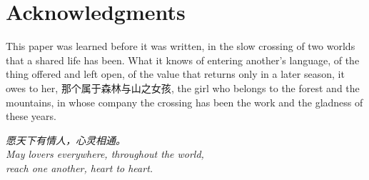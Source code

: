 \section*{\textcolor{rosedeep}{Acknowledgments}}

\noindent
This paper was learned before it was written, in the slow crossing of two worlds that a shared life has been. What it knows of entering another's language, of the thing offered and left open, of the value that returns only in a later season, it owes to her, {\cjk 那个属于森林与山之女孩}, the girl who belongs to the forest and the mountains, in whose company the crossing has been the work and the gladness of these years.

\vspace{0.8em}
\begin{center}
\begin{minipage}{0.78\linewidth}
\centering\itshape\color{rose}
{\cjk 愿天下有情人，心灵相通。}\\[0.35em]
\upshape\footnotesize\color{gold}
May lovers everywhere, throughout the world,\\
reach one another, heart to heart.
\end{minipage}
\end{center}
